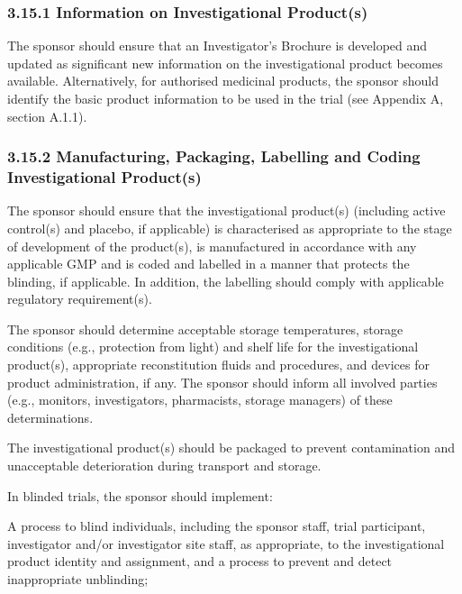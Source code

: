 \documentclass[11pt]{article}
\begin{document}
\subsubsection{3.15.1 Information on Investigational Product(s)}

The sponsor should ensure that an Investigator's Brochure is developed and updated as significant new information on the investigational product becomes available. Alternatively, for authorised medicinal products, the sponsor should identify the basic product information to be used in the trial (see Appendix A, section A.1.1).


\subsubsection{3.15.2 Manufacturing, Packaging, Labelling and Coding Investigational Product(s)}

\begin{description}[leftmargin=2.5cm,style=sameline]

\item[(a)] The sponsor should ensure that the investigational product(s) (including active control(s) and placebo, if applicable) is characterised as appropriate to the stage of development of the product(s), is manufactured in accordance with any applicable GMP and is coded and labelled in a manner that protects the blinding, if applicable. In addition, the labelling should comply with applicable regulatory requirement(s).

\item[(b)] The sponsor should determine acceptable storage temperatures, storage conditions (e.g., protection from light) and shelf life for the investigational product(s), appropriate reconstitution fluids and procedures, and devices for product administration, if any. The sponsor should inform all involved parties (e.g., monitors, investigators, pharmacists, storage managers) of these determinations.

\item[(c)] The investigational product(s) should be packaged to prevent contamination and unacceptable deterioration during transport and storage.

\item[(d)] In blinded trials, the sponsor should implement:

\item[(i)] A process to blind individuals, including the sponsor staff, trial participant, investigator and/or investigator site staff, as appropriate, to the investigational product identity and assignment, and a process to prevent and detect inappropriate unblinding;

\end{description}
\end{document}

